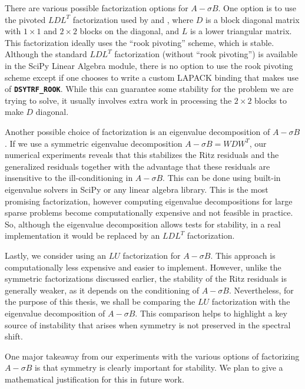 There are various possible factorization options for $A-\sigma B$. One option is to use the pivoted $LDL^{T}$ factorization used by \cite{stewart2024spectraltransformationdensesymmetric} and \cite{Ericsson1980TheST}, where $D$ is a block diagonal matrix with $1 \times 1$ and $2 \times 2$ blocks on the diagonal, and $L$ is a lower triangular matrix. This factorization ideally uses the ``rook pivoting'' scheme, which is stable. Although the standard $LDL^T$ factorization (without ``rook pivoting'') is available in the SciPy Linear Algebra module, there is no option to use the rook pivoting scheme except if one chooses to write a custom LAPACK binding that makes use of \textbf{\texttt{DSYTRF\_ROOK}}. While this can guarantee some stability for the problem we are trying to solve, it usually involves extra work in processing the $2 \times 2$ blocks to make $D$ diagonal.

Another possible choice of factorization is an eigenvalue decomposition of $A - \sigma B$. If we use a symmetric eigenvalue decomposition $A- \sigma B = WDW^T$, our numerical experiments reveals that this stabilizes the Ritz residuals and the generalized residuals together with the advantage that these residuals are insensitive to the ill-conditioning in $A-\sigma B$. This can be done using built-in eigenvalue solvers in SciPy or any linear algebra library. This is the most promising factorization, however computing eigenvalue decompositions for large sparse problems become computationally expensive and not feasible in practice. So, although the eigenvalue decomposition allows tests for stability, in a real implementation it would be replaced by an $LDL^T$ factorization.

Lastly, we consider using an $LU$ factorization for $A-\sigma B$. This approach is computationally less expensive and easier to implement. However, unlike the symmetric factorizations discussed earlier, the stability of the Ritz residuals is generally weaker, as it depends on the conditioning of $A-\sigma B$. Nevertheless, for the purpose of this thesis, we shall be comparing the $LU$ factorization with the eigenvalue decomposition of $A-\sigma B$. This comparison helps to highlight a key source of instability that arises when symmetry is not preserved in the spectral shift.

One major takeaway from our experiments with the various options of factorizing $A-\sigma B$ is that symmetry is clearly important for stability. We plan to give a mathematical justification for this in future work.

